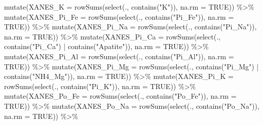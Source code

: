 \documentclass[
]{article}
\newenvironment{Shaded}{\begin{snugshade}}{\end{snugshade}}
\newcommand{\AttributeTok}[1]{\textcolor[rgb]{0.77,0.63,0.00}{#1}}
\newcommand{\ConstantTok}[1]{\textcolor[rgb]{0.00,0.00,0.00}{#1}}
\newcommand{\FunctionTok}[1]{\textcolor[rgb]{0.00,0.00,0.00}{#1}}
\newcommand{\NormalTok}[1]{#1}
\newcommand{\SpecialCharTok}[1]{\textcolor[rgb]{0.00,0.00,0.00}{#1}}
\newcommand{\StringTok}[1]{\textcolor[rgb]{0.31,0.60,0.02}{#1}}
\begin{document}
\begin{Shaded}
\begin{Highlighting}[]
  \FunctionTok{mutate}\NormalTok{(}\AttributeTok{XANES\_K =} \FunctionTok{rowSums}\NormalTok{(}\FunctionTok{select}\NormalTok{(., }\FunctionTok{contains}\NormalTok{(}\StringTok{"K"}\NormalTok{)), }\AttributeTok{na.rm =} \ConstantTok{TRUE}\NormalTok{)) }\SpecialCharTok{\%\textgreater{}\%}
  \FunctionTok{mutate}\NormalTok{(}\AttributeTok{XANES\_Pi\_Fe =} \FunctionTok{rowSums}\NormalTok{(}\FunctionTok{select}\NormalTok{(., }\FunctionTok{contains}\NormalTok{(}\StringTok{"Pi\_Fe"}\NormalTok{)), }\AttributeTok{na.rm =} \ConstantTok{TRUE}\NormalTok{)) }\SpecialCharTok{\%\textgreater{}\%}
  \FunctionTok{mutate}\NormalTok{(}\AttributeTok{XANES\_Pi\_Na =} \FunctionTok{rowSums}\NormalTok{(}\FunctionTok{select}\NormalTok{(., }\FunctionTok{contains}\NormalTok{(}\StringTok{"Pi\_Na"}\NormalTok{)), }\AttributeTok{na.rm =} \ConstantTok{TRUE}\NormalTok{)) }\SpecialCharTok{\%\textgreater{}\%}
  \FunctionTok{mutate}\NormalTok{(}\AttributeTok{XANES\_Pi\_Ca =} \FunctionTok{rowSums}\NormalTok{(}\FunctionTok{select}\NormalTok{(., }\FunctionTok{contains}\NormalTok{(}\StringTok{"Pi\_Ca"}\NormalTok{) }\SpecialCharTok{|} \FunctionTok{contains}\NormalTok{(}\StringTok{"Apatite"}\NormalTok{)), }\AttributeTok{na.rm =} \ConstantTok{TRUE}\NormalTok{)) }\SpecialCharTok{\%\textgreater{}\%}
  \FunctionTok{mutate}\NormalTok{(}\AttributeTok{XANES\_Pi\_Al =} \FunctionTok{rowSums}\NormalTok{(}\FunctionTok{select}\NormalTok{(., }\FunctionTok{contains}\NormalTok{(}\StringTok{"Pi\_Al"}\NormalTok{)), }\AttributeTok{na.rm =} \ConstantTok{TRUE}\NormalTok{)) }\SpecialCharTok{\%\textgreater{}\%}
  \FunctionTok{mutate}\NormalTok{(}\AttributeTok{XANES\_Pi\_Mg =} \FunctionTok{rowSums}\NormalTok{(}\FunctionTok{select}\NormalTok{(., }\FunctionTok{contains}\NormalTok{(}\StringTok{"Pi\_Mg"}\NormalTok{) }\SpecialCharTok{|} \FunctionTok{contains}\NormalTok{(}\StringTok{"NH4\_Mg"}\NormalTok{)), }\AttributeTok{na.rm =} \ConstantTok{TRUE}\NormalTok{)) }\SpecialCharTok{\%\textgreater{}\%}
  \FunctionTok{mutate}\NormalTok{(}\AttributeTok{XANES\_Pi\_K =} \FunctionTok{rowSums}\NormalTok{(}\FunctionTok{select}\NormalTok{(., }\FunctionTok{contains}\NormalTok{(}\StringTok{"Pi\_K"}\NormalTok{)), }\AttributeTok{na.rm =} \ConstantTok{TRUE}\NormalTok{)) }\SpecialCharTok{\%\textgreater{}\%}
  \FunctionTok{mutate}\NormalTok{(}\AttributeTok{XANES\_Po\_Fe =} \FunctionTok{rowSums}\NormalTok{(}\FunctionTok{select}\NormalTok{(., }\FunctionTok{contains}\NormalTok{(}\StringTok{"Po\_Fe"}\NormalTok{)), }\AttributeTok{na.rm =} \ConstantTok{TRUE}\NormalTok{)) }\SpecialCharTok{\%\textgreater{}\%}
  \FunctionTok{mutate}\NormalTok{(}\AttributeTok{XANES\_Po\_Na =} \FunctionTok{rowSums}\NormalTok{(}\FunctionTok{select}\NormalTok{(., }\FunctionTok{contains}\NormalTok{(}\StringTok{"Po\_Na"}\NormalTok{)), }\AttributeTok{na.rm =} \ConstantTok{TRUE}\NormalTok{)) }\SpecialCharTok{\%\textgreater{}\%}

\end{Highlighting}
\end{Shaded}
\end{document}

